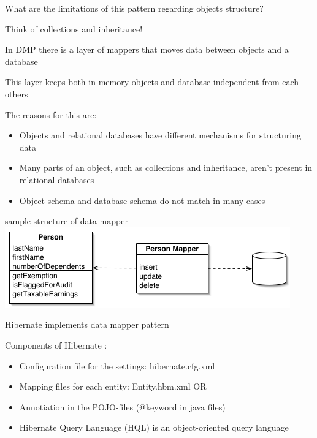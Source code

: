 \documentclass{beamer}
\begin{document}
\begin{slide}{
\item What are the limitations of this pattern regarding objects structure? 
\pause
\item Think of collections and inheritance! 
}\end{slide}


\begin{slide}{
\item In DMP there is a layer of mappers that moves data between objects and a database 
\item This layer keeps both in-memory objects and database independent from each others 
\item The reasons for this are:
\pause
\begin{itemize}
\item Objects and relational databases have different mechanisms for structuring data
\pause
\item Many parts of an object, such as collections and inheritance, aren't present in relational databases
\item Object schema and database schema do not match in many cases
\end{itemize}
}\end{slide}


\begin{slide}{
\item sample structure of data mapper 
\\
\includegraphics[scale=0.5]{img/databaseMapperSketch.png}
}\end{slide}



\begin{slide}{
\item Hibernate implements data mapper pattern
\item Components of Hibernate : 	
\begin{itemize}
\item Configuration file for the settings: hibernate.cfg.xml 
\pause
\item Mapping files for each entity: Entity.hbm.xml OR
\pause 
\item Annotiation in the POJO-files (@keyword in java files)
\pause
\item Hibernate Query Language (HQL) is an object-oriented query language
\end{itemize}
}\end{slide}
\end{document}
